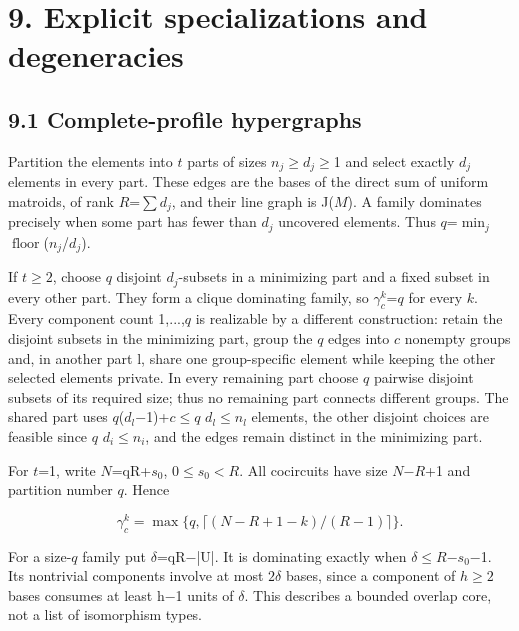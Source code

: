 \documentclass[11pt]{article}
\begin{document}
\section*{9. Explicit specializations and degeneracies}

\subsection*{9.1 Complete-profile hypergraphs}

Partition the elements into \(t\) parts of sizes \(n_j\)\(\ge\)\(d_j\)\(\ge\)1 and select exactly \(d_j\) elements in every part. These edges are the bases of the direct sum of uniform matroids, of rank \(R\)=\(\sum d_j\), and their line graph is J(\(M\)). A family dominates precisely when some part has fewer than \(d_j\) uncovered elements. Thus \(q\)=\(\min_j\) \(\operatorname{floor}\)(\(n_j\)/\(d_j\)).

If \(t\ge2\), choose \(q\) disjoint \(d_j\)-subsets in a minimizing part and a fixed subset in every other part. They form a clique dominating family, so \(\gamma_c^k\)=\(q\) for every \(k\). Every component count 1,...,\(q\) is realizable by a different construction: retain the disjoint subsets in the minimizing part, group the \(q\) edges into \(c\) nonempty groups and, in another part l, share one group-specific element while keeping the other selected elements private. In every remaining part choose \(q\) pairwise disjoint subsets of its required size; thus no remaining part connects different groups. The shared part uses \(q\)(\(d_l\)\ensuremath{-}1)+\(c\)\(\le\)\(q\) \(d_l\)\(\le\)\(n_l\) elements, the other disjoint choices are feasible since \(q\) \(d_i\)\(\le\)\(n_i\), and the edges remain distinct in the minimizing part.

For \(t\)=1, write \(N\)=qR+\(s_0\), \(0\le s_0<R\). All cocircuits have size \(N\)\ensuremath{-}\(R\)+1 and partition number \(q\). Hence

\[
\gamma_c^k=\max\{q,\lceil(N-R+1-k)/(R-1)\rceil\}.
\]

For a size-\(q\) family put \(\delta\)=qR\ensuremath{-}|U|. It is dominating exactly when \(\delta\)\(\le\)\(R\)\ensuremath{-}\(s_0\)\ensuremath{-}1. Its nontrivial components involve at most \(2\delta\) bases, since a component of \(h\ge2\) bases consumes at least h\ensuremath{-}1 units of \(\delta\). This describes a bounded overlap core, not a list of isomorphism types.
\end{document}
